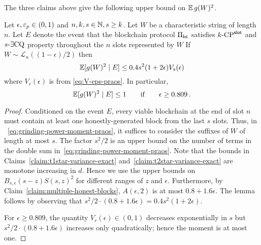 The three claims above give the following upper bound on $\operatorname{\mathbb{E}} g(W)^2$.


\begin{lemma}\label{lemma:grinding-praos-second-moment}
  Let $\epsilon, \mathsf{\varepsilon}_p \in (0, 1)$ and $n, k, s \in \mathbb{N}, s \geq k$. 
  Let $W$ be a characteristic string of length $n$. 
  Let $E$ denote the event that 
  the blockchain protocol $\Pi_\mathsf{bc}$ 
  satisfies ${k}\text{-}\mathrm{CP}^{\mathsf{slot}}$ and ${s}\text{-}\exists\mathrm{CQ}$ property throughout 
  the $n$ slots represented by $W$   
  If $W  \sim \mathcal{L}_n((1 - \epsilon)/2)$ then
  \begin{equation}\label{eq:grinding-praos-second-moment}
    \operatorname{\mathbb{E}}[ g(W)^2 \mid E] 
    \leq 
      0.4 s^2 (1 + 2\epsilon) V_s(\epsilon)
  \end{equation}
  where $V_r(\epsilon)$ is from \eqref{eq:V-eps-praos}. 
  In particular, 
  $$
    \operatorname{\mathbb{E}} [g(W)^2 \mid E] \leq 1
    \qquad \text{if} \qquad \epsilon \geq 0.809\,.
  $$
\end{lemma}
\noindent
\begin{proof}
  Conditioned on the event $E$, 
  every viable blockchain at the end of slot $n$ 
  must contain at least one honestly-generated block from the last $s$ 
  slots.
  Thus, 
  in ~\eqref{eq:grinding-power-moment-praos}, 
  it suffices to consider the suffixes of $W$ of length at most $s$. 
  The factor $s^2/2$ is an upper bound on 
  the number of terms in the double sum in~\eqref{eq:grinding-power-moment-praos}. 
  Note that the bounds in 
  Claims~\ref{claim:t1star-variance-exact} 
  and~\ref{claim:t2star-variance-exact} are monotone increasing in $d$. 
  Hence we use the upper bounds on $B_{s, \epsilon}(s-z) S(s,z)^2$ for 
  different ranges of $z$ and $\epsilon$. 
  Furthermore, by Claim~\ref{claim:multiple-honest-blocks}, 
  $A(\epsilon, 2)$ is at most $0.8 + 1.6 \epsilon$. 
  The lemma follows by observing that $s^2/2 \cdot (0.8 + 1.6 \epsilon) = 0.4 s^2 (1 + 2 \epsilon)$.

  For $\epsilon \geq 0.809$, 
  the quantity $V_r(\epsilon) \in (0,1)$ decreases exponentially in $s$ 
  but $s^2/2 \cdot (0.8 + 1.6 \epsilon)$ increases only quadratically; 
  hence the moment is at most one.

\end{proof}






